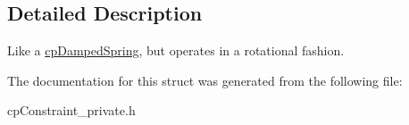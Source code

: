 \subsection{Detailed Description}
Like a \hyperlink{structcp_damped_spring}{cp\+Damped\+Spring}, but operates in a rotational fashion. 

The documentation for this struct was generated from the following file\+:\begin{DoxyCompactItemize}
\item 
cp\+Constraint\+\_\+private.\+h\end{DoxyCompactItemize}
